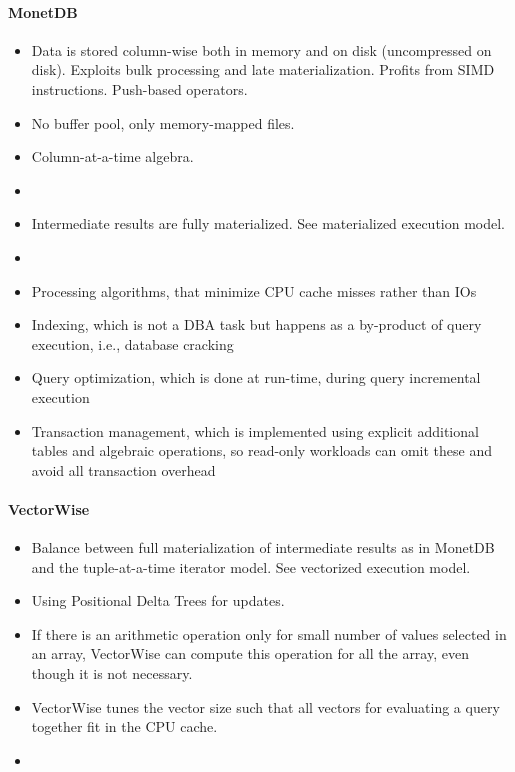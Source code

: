 \paragraph{MonetDB}
\begin{itemize}
    \item Data is stored column-wise both in memory and on disk (uncompressed on disk). Exploits bulk processing and late materialization. Profits from SIMD instructions. Push-based operators.
    \item No buffer pool, only memory-mapped files. %
    \item Column-at-a-time algebra.
    \item %
    \item Intermediate results are fully materialized. See materialized execution model.
    \item
    \item Processing algorithms, that minimize CPU cache misses rather than IOs
    \item Indexing, which is not a DBA task but happens as a by-product of query execution, i.e., database cracking
    \item Query optimization, which is done at run-time, during query incremental execution
    \item Transaction management, which is implemented using explicit additional tables and algebraic operations, so read-only workloads can omit these and avoid all transaction overhead
\end{itemize}

\paragraph{VectorWise}
\begin{itemize}
    \item Balance between full materialization of intermediate results as in MonetDB and the tuple-at-a-time iterator model. See vectorized execution model.
    \item Using Positional Delta Trees for updates.
    \item If there is an arithmetic operation only for small number of values selected in an array, VectorWise can compute this operation for all the array, even though it is not necessary.
    \item VectorWise tunes the vector size such that all vectors for evaluating a query together fit in the CPU cache.
    \item 
\end{itemize}

